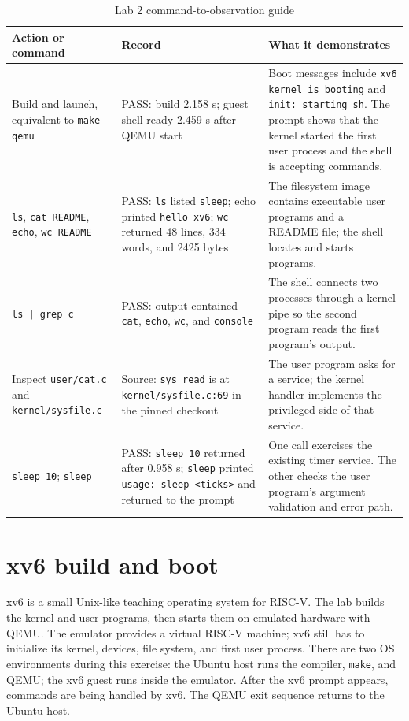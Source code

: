 \documentclass{assets/utmreport}
\begin{document}
\begin{table}[htbp]
\caption{Lab 2 command-to-observation guide}
\label{tab:lab2-observations}
\centering
\small
\begin{tabularx}{\textwidth}{|p{3.5cm}|p{4.5cm}|Y|}
\hline
\textbf{Action or command} & \textbf{Record} & \textbf{What it demonstrates} \\
\hline
Build and launch, equivalent to \texttt{make qemu} & PASS: build 2.158 s; guest shell ready 2.459 s after QEMU start & Boot messages include \texttt{xv6 kernel is booting} and \texttt{init: starting sh}. The prompt shows that the kernel started the first user process and the shell is accepting commands. \\
\hline
\texttt{ls}, \texttt{cat README}, \texttt{echo}, \texttt{wc README} & PASS: \texttt{ls} listed \texttt{sleep}; echo printed \texttt{hello xv6}; \texttt{wc} returned 48 lines, 334 words, and 2425 bytes & The filesystem image contains executable user programs and a README file; the shell locates and starts programs. \\
\hline
\texttt{ls | grep c} & PASS: output contained \texttt{cat}, \texttt{echo}, \texttt{wc}, and \texttt{console} & The shell connects two processes through a kernel pipe so the second program reads the first program's output. \\
\hline
Inspect \texttt{user/cat.c} and \texttt{kernel/sysfile.c} & Source: \texttt{sys\_read} is at \texttt{kernel/sysfile.c:69} in the pinned checkout & The user program asks for a service; the kernel handler implements the privileged side of that service. \\
\hline
\texttt{sleep 10}; \texttt{sleep} & PASS: \texttt{sleep 10} returned after 0.958 s; \texttt{sleep} printed \texttt{usage: sleep <ticks>} and returned to the prompt & One call exercises the existing timer service. The other checks the user program's argument validation and error path. \\
\hline
\end{tabularx}
\end{table}

\section{xv6 build and boot}

xv6 is a small Unix-like teaching operating system for RISC-V. The lab builds the kernel and user programs, then starts them on emulated hardware with QEMU. The emulator provides a virtual RISC-V machine; xv6 still has to initialize its kernel, devices, file system, and first user process. There are two OS environments during this exercise: the Ubuntu host runs the compiler, \texttt{make}, and QEMU; the xv6 guest runs inside the emulator. After the xv6 prompt appears, commands are being handled by xv6. The QEMU exit sequence returns to the Ubuntu host.
\end{document}
